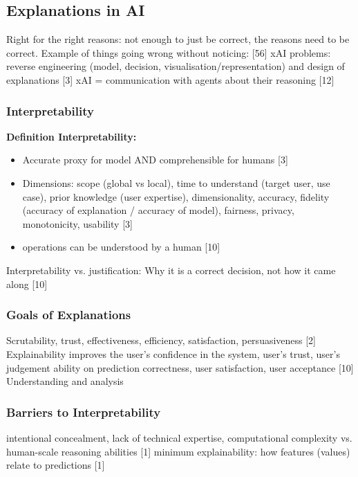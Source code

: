 \subsection{Explanations in AI}
Right for the right reasons: not enough to just be correct, the reasons need to be correct. Example of things going wrong without noticing: [56] \newline
xAI problems: reverse engineering (model, decision, visualisation/representation) and design of explanations [3] \newline
xAI = communication with agents about their reasoning [12] \newline



\subsubsection{Interpretability}
\textbf{Definition Interpretability:}
\begin{itemize}
	\item Accurate proxy for model AND comprehensible for humans [3]
	\item Dimensions: scope (global vs local), time to understand (target user, use case), prior knowledge (user expertise), dimensionality, accuracy, fidelity (accuracy of explanation / accuracy of model), fairness, privacy, monotonicity, usability [3]
	\item operations can be understood by a human [10]
\end{itemize}
Interpretability vs. justification: Why it is a correct decision, not how it came along [10]\newline



\subsubsection{Goals of Explanations}
Scrutability, trust, effectiveness, efficiency, satisfaction, persuasiveness [2] \newline
Explainability improves the user's confidence in the system, user's trust, user's judgement ability on prediction correctness, user satisfaction, user acceptance [10] \newline
Understanding and analysis 



\subsubsection{Barriers to Interpretability}
intentional concealment, lack of technical expertise, computational complexity vs. human-scale reasoning abilities [1] \newline
minimum explainability: how features (values) relate to predictions [1] \newline




